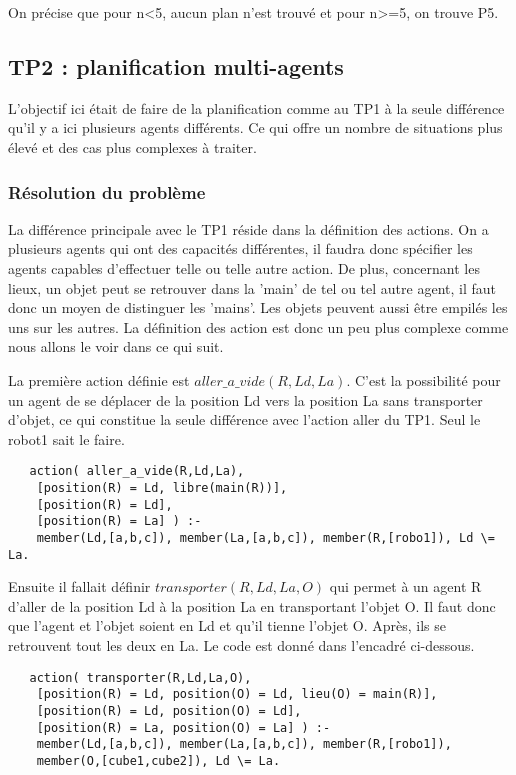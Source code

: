 \documentclass[a4paper,10pt]{article}
\begin{document}
   On pr\'{e}cise que pour n<5, aucun plan n'est trouvé et pour n>=5, on trouve P5.
   
  \subsection{TP2 : planification multi-agents}
 L'objectif ici \'{e}tait de faire de la planification comme au TP1 à la seule différence qu'il y a ici plusieurs agents différents.
 Ce qui offre un nombre de situations plus \'{e}lev\'{e} et des cas plus complexes \`{a} traiter.
 
   \subsubsection{R\'{e}solution du probl\`{e}me}
   La diff\'{e}rence principale avec le TP1 r\'{e}side dans la d\'{e}finition des actions. On a plusieurs agents qui ont des capacit\'{e}s diff\'{e}rentes, il faudra donc
   sp\'{e}cifier les agents capables d'effectuer telle ou telle autre action. De plus, concernant les lieux, un objet peut se retrouver dans la 'main' de tel ou tel autre agent,
   il faut donc un moyen de distinguer les 'mains'. Les objets peuvent aussi \^{e}tre empil\'{e}s les uns sur les autres. La d\'{e}finition des action est donc un peu plus complexe
   comme nous allons le voir dans ce qui suit.
   
   La premi\`{e}re action d\'{e}finie est $aller\_a\_vide(R,Ld,La)$. C'est la possibilit\'{e} pour un agent de se d\'{e}placer de la position Ld vers la position La sans 
   transporter d'objet, ce qui constitue la seule diff\'{e}rence avec l'action aller du TP1. Seul le robot1 sait le faire.
   
   \begin{lstlisting}
   action( aller_a_vide(R,Ld,La),
	[position(R) = Ld, libre(main(R))],
	[position(R) = Ld],
	[position(R) = La] ) :-
	member(Ld,[a,b,c]), member(La,[a,b,c]), member(R,[robo1]), Ld \= La.
   \end{lstlisting}
   
   Ensuite il fallait d\'{e}finir $transporter(R,Ld,La,O)$ qui permet \`{a} un agent R d'aller de la position Ld \`{a} la position La en transportant l'objet O.
   Il faut donc que l'agent et l'objet soient en Ld et qu'il tienne l'objet O. Apr\`{e}s, ils se retrouvent tout les deux en La. Le code est donn\'{e} dans l'encadré ci-dessous.
   
   \begin{lstlisting}
   action( transporter(R,Ld,La,O),
	[position(R) = Ld, position(O) = Ld, lieu(O) = main(R)],
	[position(R) = Ld, position(O) = Ld],
	[position(R) = La, position(O) = La] ) :-
	member(Ld,[a,b,c]), member(La,[a,b,c]), member(R,[robo1]), 
	member(O,[cube1,cube2]), Ld \= La.
   \end{lstlisting}
   
\end{document}
